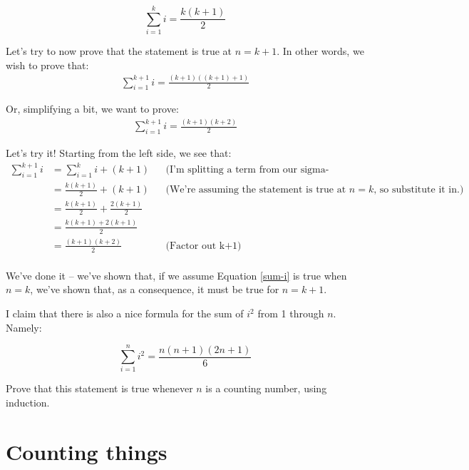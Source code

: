 \begin{equation*}
\sum_{i=1}^k i = \frac{k(k+1)}{2}
\end{equation*}

Let's try to now prove that the statement is true at $n = k + 1$. In other words, we wish to prove that:
\begin{align*}
\sum_{i=1}^{k+1} i = \frac{(k+1)((k+1)+1)}{2}
\end{align*}

Or, simplifying a bit, we want to prove:
\begin{align*}
\sum_{i=1}^{k+1} i = \frac{(k+1)(k+2)}{2}
\end{align*}

Let's try it! Starting from the left side, we see that:
\begin{align*}
\sum_{i=1}^{k+1} i &= \sum_{i=1}^{k} i + (k+1) && \text{(I'm splitting a term from our sigma-expression. See why it works?)} \\
&= \frac{k(k+1)}{2} + (k+1) && \text{(We're assuming the statement is true at $n=k$, so substitute it in.)} \\
&= \frac{k(k+1)}{2} + \frac{2(k+1)}{2} \\
&= \frac{k(k+1) + 2(k+1)}{2} \\
&= \frac{(k+1)(k+2)}{2} && \text{(Factor out k+1)}\\
\end{align*}

We've done it -- we've shown that, if we assume Equation \ref{sum-i} is true when $n=k$, we've shown that, as a consequence, it must be true for $n = k+1$. 


\begin{exercise}
\label{sum-i2}
I claim that there is also a nice formula for the sum of $i^2$ from 1 through $n$. Namely:

\begin{equation}
\label{eq:sum-i2}
\sum_{i=1}^{n} i^2 = \frac{n(n+1)(2n+1)}{6}
\end{equation}

Prove that this statement is true whenever $n$ is a counting number, using induction.
\end{exercise}


\section{Counting things}

